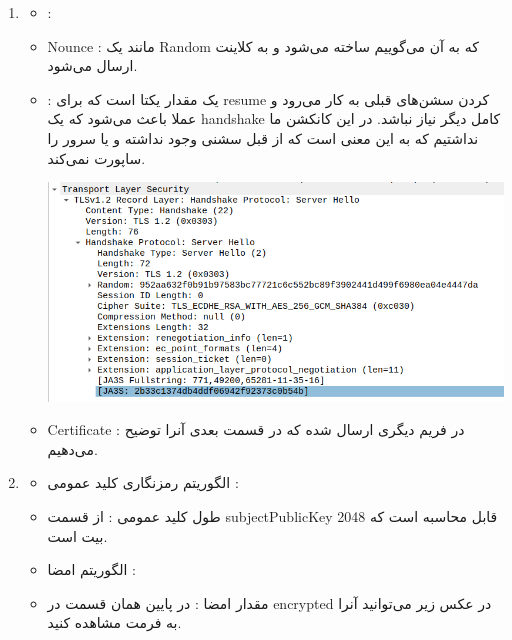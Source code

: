 \begin{enumerate}[label=\alph*)]
\begin{itemize}
\begin{center}
        \end{center}
    \end{itemize}
    \item 
    \textbf{}
    \begin{itemize}
        \item {} : 
        \item Nounce : مانند  یک Random که به آن  می‌گوییم ساخته می‌شود و به کلاینت ارسال می‌شود.
        \item {} : یک مقدار یکتا است که برای resume کردن 
        سشن‌های قبلی به کار می‌رود و عملا باعث می‌شود که یک handshake کامل دیگر نیاز نباشد. در این کانکشن ما  نداشتیم 
        که به این معنی است که از قبل سشنی وجود نداشته و یا سرور  را ساپورت نمی‌کند.
        \begin{center}
            \includegraphics[scale=0.5]{pics/server_hello.png}
        \end{center}
        \item Certificate : در فریم دیگری ارسال شده که در قسمت بعدی آنرا توضیح می‌دهیم.
    \end{itemize}
    \item 
    \textbf{}
    \begin{itemize}
        \item الگوریتم رمزنگاری کلید عمومی : 
        \item طول کلید عمومی : از قسمت subjectPublicKey قابل محاسبه است که 2048 بیت است.
        \item الگوریتم امضا : 
        \item مقدار امضا : در پایین همان قسمت در encrypted 
        در عکس زیر می‌توانید آنرا به فرمت  مشاهده کنید.
        \begin{center}

\end{center}
\end{itemize}
\end{enumerate}
